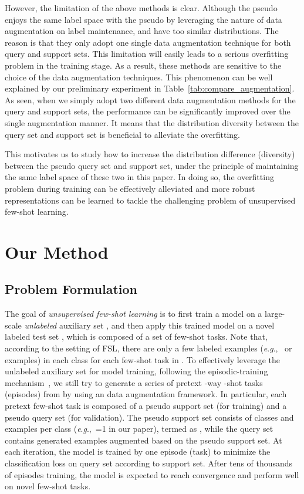 \documentclass[letterpaper]{article} \usepackage{aaai21}  \usepackage{times}  \usepackage{helvet} \usepackage{courier}  \usepackage[hyphens]{url}  \usepackage{graphicx} \urlstyle{rm} \def\UrlFont{\rm}  \usepackage{natbib}  \usepackage{caption} \usepackage{url}
\newcommand{\eg}{\textit{e}.\textit{g}.,}
\begin{document}
However, the limitation of the above methods is clear. Although the pseudo  enjoys the same label space with the pseudo  by leveraging the nature of data augmentation on label maintenance,  and  have too similar distributions. The reason is that they only adopt one single data augmentation technique for both query and support sets. This limitation will easily leads to a serious overfitting problem in the training stage. As a result, these methods are sensitive to the choice of the data augmentation techniques. This phenomenon can be well explained by our preliminary experiment in Table~\ref{tab:compare_augmentation}. As seen, when we simply adopt two different data augmentation methods for the query and support sets, the performance can be significantly improved over the single augmentation manner. It means that the distribution diversity between the query set and support set is beneficial to alleviate the overfitting.

This motivates us to study how to increase the distribution difference (diversity) between the pseudo query set and support set, under the principle of maintaining the same label space of these two in this paper. In doing so, the overfitting problem during training can be effectively alleviated and more robust representations can be learned to tackle the challenging problem of unsupervised few-shot learning.
\fi


\section{Our Method}

\subsection{Problem Formulation}
\label{problem_formulation}
The goal of \textit{unsupervised few-shot learning} is to first train a model on a large-scale \textit{unlabeled} auxiliary set , and then apply this trained model on a novel labeled test set , which is composed of a set of few-shot tasks. Note that, according to the setting of FSL, there are only a few labeled examples (\eg~ or  examples) in each class for each few-shot task in . To effectively leverage the unlabeled auxiliary set  for model training, following the episodic-training mechanism~\cite{Vinyals2016NIPS}, we still try to generate a series of pretext -way -shot tasks (episodes) from  by using an data augmentation framework. In particular, each pretext few-shot task is composed of a pseudo support set (for training) and a pseudo query set (for validation). The pseudo support set consists of  classes and  examples per class (\eg~=1 in our paper), termed as , while the query set  contains  generated examples augmented based on the pseudo support set. At each iteration, the model is trained by one episode (task) to minimize the classification loss on query set according to support set. After tens of thousands of episodes training, the model is expected to reach convergence and perform well on novel few-shot tasks.
\end{document}
